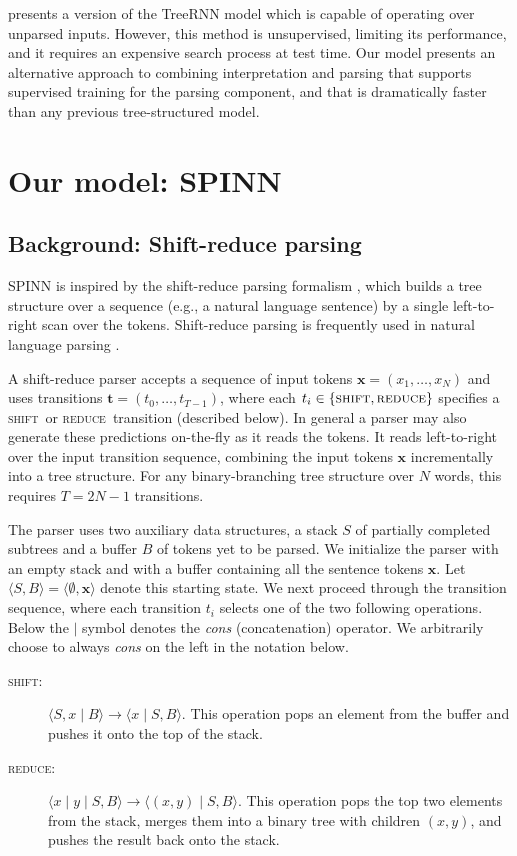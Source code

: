 \documentclass[11pt]{article}
\newcommand{\shift}{\textsc{shift}}
\newcommand{\reduce}{\textsc{reduce}}
\begin{document}
\citet{socher2011semi} presents a version of the TreeRNN model which is capable of operating over unparsed inputs. However, this method is unsupervised, limiting its performance, and it requires an expensive search process at test time. Our model presents an alternative approach to combining interpretation and parsing that supports supervised training for the parsing component, and that is dramatically faster than any previous tree-structured model. 

\section{Our model: SPINN}

\subsection{Background: Shift-reduce parsing}

SPINN is inspired by the shift-reduce parsing formalism \citep{aho1972theory}, which builds a tree structure over a sequence (e.g., a natural language sentence) by a single left-to-right scan over the tokens. Shift-reduce parsing is frequently used in natural language parsing \citep[e.g.,][]{nivre2003efficient}.

A shift-reduce parser accepts a sequence of input tokens $\mathbf x = (x_1, \dots, x_N)$ and uses transitions $\mathbf t = (t_0, \dots, t_{T-1})$, where each $t_i \in \{\shift, \reduce\}$ specifies a \shift~or \reduce~transition (described below). In general a parser may also generate these predictions on-the-fly as it reads the tokens. It reads left-to-right over the input transition sequence, combining the input tokens $\mathbf x$ incrementally into a tree structure. For any binary-branching tree structure over $N$ words, this requires $T = 2N - 1$ transitions.

The parser uses two auxiliary data structures, a stack $S$ of partially completed subtrees and a buffer $B$ of tokens yet to be parsed. We initialize the parser with an empty stack and with a buffer containing all the sentence tokens $\mathbf x$. Let $\langle S, B \rangle = \langle \emptyset, \mathbf x \rangle$ denote this starting state. We next proceed through the transition sequence, where each transition $t_i$ selects one of the two following operations. Below the $\mid$ symbol denotes the \textit{cons} (concatenation) operator. We arbitrarily choose to always \textit{cons} on the left in the notation below.
\begin{description}
  \item[\shift:] $\langle S, x \mid B \rangle \to \langle x \mid S, B \rangle$. This operation pops an element from the buffer and pushes it onto the top of the stack.
  \item[\reduce:] $\langle x \mid y \mid S, B \rangle \to \langle (x, y) \mid S, B \rangle$. This operation pops the top two elements from the stack, merges them into a binary tree with children $(x, y)$, and pushes the result back onto the stack.
\end{description}
\end{document}
